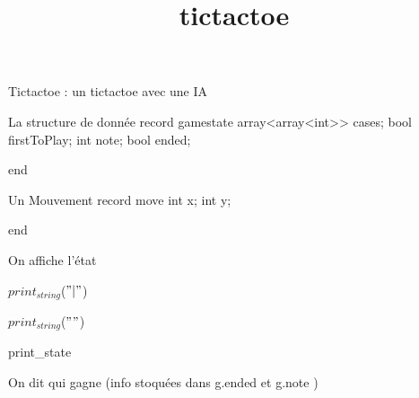 \documentclass[8pt]{article}
\title{tictactoe}
\begin{document}
\maketitle

Tictactoe : un tictactoe avec une IA

 La structure de donn\'ee 
record gamestate array<array<int>> cases;
bool firstToPlay;
int note;
bool ended;

end

 Un Mouvement 
record move int x;
int y;

end

 On affiche l'\'etat 
\begin{algorithm}[H]

$print_{string}$($ "
|" $)\;

$print_{string}$($ "
" $)\;
\caption{print\_state}
\end{algorithm}
 On dit qui gagne (info stoqu\'ees dans g.ended et g.note ) 
\end{document}
